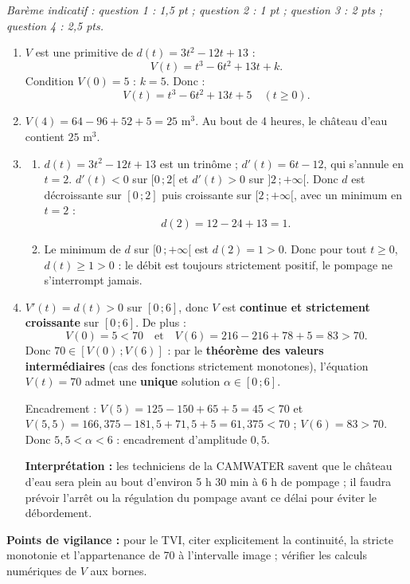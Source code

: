 \documentclass[11pt]{article}
\begin{document}
\begin{corrige}
\emph{Barème indicatif : question 1 : 1,5 pt ; question 2 : 1 pt ; question 3 : 2 pts ; question 4 : 2,5 pts.}
\begin{enumerate}
\item $V$ est une primitive de $d(t) = 3t^2 - 12t + 13$ :
\[
V(t) = t^3 - 6t^2 + 13t + k.
\]
Condition $V(0) = 5$ : $k = 5$. Donc :
\[
V(t) = t^3 - 6t^2 + 13t + 5 \quad (t \geq 0).
\]
\item $V(4) = 64 - 96 + 52 + 5 = 25$ m$^3$. Au bout de 4 heures, le château d'eau contient $25$ m$^3$.
\item \begin{enumerate}
\item $d(t) = 3t^2 - 12t + 13$ est un trinôme ; $d'(t) = 6t - 12$, qui s'annule en $t = 2$. $d'(t) < 0$ sur $[0\,;2[$ et $d'(t) > 0$ sur $]2\,;+\infty[$. Donc $d$ est décroissante sur $[0\,;2]$ puis croissante sur $[2\,;+\infty[$, avec un minimum en $t = 2$ :
\[
d(2) = 12 - 24 + 13 = 1.
\]
\item Le minimum de $d$ sur $[0\,;+\infty[$ est $d(2) = 1 > 0$. Donc pour tout $t \geq 0$, $d(t) \geq 1 > 0$ : le débit est toujours strictement positif, le pompage ne s'interrompt jamais.
\end{enumerate}
\item $V'(t) = d(t) > 0$ sur $[0\,;6]$, donc $V$ est \textbf{continue et strictement croissante} sur $[0\,;6]$. De plus :
\[
V(0) = 5 < 70 \quad \text{et} \quad V(6) = 216 - 216 + 78 + 5 = 83 > 70.
\]
Donc $70 \in [V(0)\,;V(6)]$ : par le \textbf{théorème des valeurs intermédiaires} (cas des fonctions strictement monotones), l'équation $V(t) = 70$ admet une \textbf{unique} solution $\alpha \in [0\,;6]$.

Encadrement : $V(5) = 125 - 150 + 65 + 5 = 45 < 70$ et $V(5{,}5) = 166{,}375 - 181{,}5 + 71{,}5 + 5 = 61{,}375 < 70$ ; $V(6) = 83 > 70$. Donc $5{,}5 < \alpha < 6$ : encadrement d'amplitude $0{,}5$.

\textbf{Interprétation :} les techniciens de la CAMWATER savent que le château d'eau sera plein au bout d'environ 5 h 30 min à 6 h de pompage ; il faudra prévoir l'arrêt ou la régulation du pompage avant ce délai pour éviter le débordement.
\end{enumerate}
\textbf{Points de vigilance :} pour le TVI, citer explicitement la continuité, la stricte monotonie et l'appartenance de 70 à l'intervalle image ; vérifier les calculs numériques de $V$ aux bornes.
\end{corrige}
\end{document}
